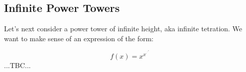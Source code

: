\subsection{Infinite Power Towers}
Let's next consider a power tower of infinite height, aka infinite tetration. We want to make sense of an expression of the form:

\begin{equation}
f(x) = x^{x^{\cdot^{\cdot^{\cdot^x}}}}
\end{equation}
...TBC...


